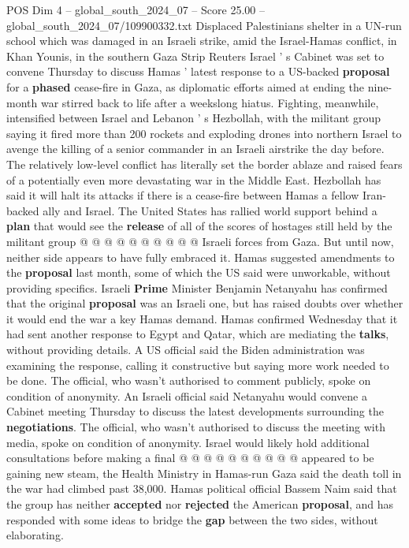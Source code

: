 \begin{textsample}{POS Dim 4 – global\_south\_2024\_07 – Score 25.00 – global\_south\_2024\_07/109900332.txt}  \label{ex:f4_pos_114}
Displaced Palestinians shelter in a UN-run school which was damaged in an Israeli strike, amid the Israel-Hamas conflict, in Khan Younis, in the southern Gaza Strip Reuters Israel ' s Cabinet was set to convene Thursday to discuss Hamas ' latest response to a US-backed \textbf{proposal} for a \textbf{phased} cease-fire in Gaza, as diplomatic efforts aimed at ending the nine-month war stirred back to life after a weekslong hiatus.
Fighting, meanwhile, intensified between Israel and Lebanon ' s Hezbollah, with the militant group saying it fired more than 200 rockets and exploding drones into northern Israel to avenge the killing of a senior commander in an Israeli airstrike the day before.
The relatively low-level conflict has literally set the border ablaze and raised fears of a potentially even more devastating war in the Middle East.
Hezbollah has said it will halt its attacks if there is a cease-fire between Hamas a fellow Iran-backed ally and Israel.
The United States has rallied world support behind a \textbf{plan} that would see the \textbf{release} of all of the scores of hostages still held by the militant group @ @ @ @ @ @ @ @ @ @ Israeli forces from Gaza.
But until now, neither side appears to have fully embraced it.
Hamas suggested amendments to the \textbf{proposal} last month, some of which the US said were unworkable, without providing specifics.
Israeli \textbf{Prime} Minister Benjamin Netanyahu has confirmed that the original \textbf{proposal} was an Israeli one, but has raised doubts over whether it would end the war a key Hamas demand.
Hamas confirmed Wednesday that it had sent another response to Egypt and Qatar, which are mediating the \textbf{talks}, without providing details.
A US official said the Biden administration was examining the response, calling it constructive but saying more work needed to be done.
The official, who wasn't authorised to comment publicly, spoke on condition of anonymity.
An Israeli official said Netanyahu would convene a Cabinet meeting Thursday to discuss the latest developments surrounding the \textbf{negotiations}.
The official, who wasn't authorised to discuss the meeting with media, spoke on condition of anonymity.
Israel would likely hold additional consultations before making a final @ @ @ @ @ @ @ @ @ @ appeared to be gaining new steam, the Health Ministry in Hamas-run Gaza said the death toll in the war had climbed past 38,000.
Hamas political official Bassem Naim said that the group has neither \textbf{accepted} nor \textbf{rejected} the American \textbf{proposal}, and has responded with some ideas to bridge the \textbf{gap} between the two sides, without elaborating.

\end{textsample}

